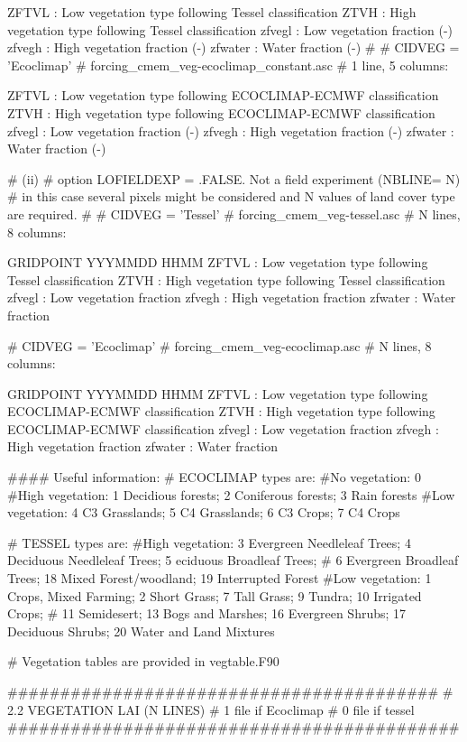 ZFTVL	: Low vegetation type following Tessel classification
ZTVH 	: High vegetation type following Tessel classification
zfvegl	: Low vegetation fraction (-)
zfvegh	: High vegetation fraction (-)
zfwater	: Water fraction (-)
#
# CIDVEG = 'Ecoclimap'
# forcing_cmem_veg-ecoclimap_constant.asc 
# 1 line, 5 columns: 

ZFTVL	: Low vegetation type following ECOCLIMAP-ECMWF classification
ZTVH 	: High vegetation type following ECOCLIMAP-ECMWF classification
zfvegl	: Low vegetation fraction (-)
zfvegh	: High vegetation fraction (-)
zfwater	: Water fraction (-)



# (ii) 
# option LOFIELDEXP = .FALSE.   Not a field experiment (NBLINE= N) 
# in this case several pixels might be considered and N values of land cover type are required.
# 
# CIDVEG = 'Tessel'
# forcing_cmem_veg-tessel.asc 
# N lines, 8 columns: 

GRIDPOINT 
YYYMMDD 
HHMM
ZFTVL	: Low vegetation type following Tessel classification
ZTVH 	: High vegetation type following Tessel classification
zfvegl	: Low vegetation fraction
zfvegh	: High vegetation fraction
zfwater	: Water fraction

# CIDVEG = 'Ecoclimap'
# forcing_cmem_veg-ecoclimap.asc 
# N lines, 8 columns: 

GRIDPOINT 
YYYMMDD 
HHMM
ZFTVL	: Low vegetation type following ECOCLIMAP-ECMWF classification
ZTVH 	: High vegetation type following ECOCLIMAP-ECMWF classification
zfvegl	: Low vegetation fraction
zfvegh	: High vegetation fraction
zfwater	: Water fraction


#### Useful information:
# ECOCLIMAP types are:
#No vegetation: 0
#High vegetation: 1 Decidious forests; 2 Coniferous forests; 3 Rain forests 
#Low vegetation: 4 C3 Grasslands; 5 C4 Grasslands; 6 C3 Crops; 7 C4 Crops

# TESSEL types are:
#High vegetation: 3 Evergreen Needleleaf Trees; 4 Deciduous Needleleaf Trees; 5 eciduous Broadleaf Trees; 
#                 6  Evergreen Broadleaf Trees; 18 Mixed Forest/woodland; 19 Interrupted Forest
#Low vegetation:  1 Crops, Mixed Farming; 2 Short Grass; 7 Tall Grass; 9 Tundra; 10 Irrigated Crops; 
#                 11 Semidesert; 13 Bogs and Marshes; 16 Evergreen Shrubs; 17 Deciduous Shrubs; 20 Water and Land Mixtures 

# Vegetation tables are provided in vegtable.F90


#########################################
# 2.2  VEGETATION LAI   (N LINES)
# 1 file if Ecoclimap
# 0 file if tessel
###########################################

